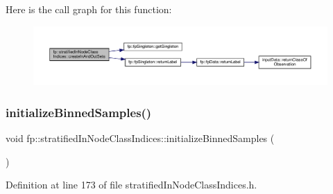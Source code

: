 Here is the call graph for this function\+:\nopagebreak
\begin{figure}[H]
\begin{center}
\leavevmode
\includegraphics[width=350pt]{classfp_1_1stratifiedInNodeClassIndices_a64bc290a78f3800cef41d42ebe64ff1b_cgraph}
\end{center}
\end{figure}
\mbox{\label{classfp_1_1stratifiedInNodeClassIndices_ae9907f8984615f91417fb7961e1b582d}} 
\subsubsection{\texorpdfstring{initialize\+Binned\+Samples()}{initializeBinnedSamples()}}
{\footnotesize\ttfamily void fp\+::stratified\+In\+Node\+Class\+Indices\+::initialize\+Binned\+Samples (\begin{DoxyParamCaption}{ }\end{DoxyParamCaption})\hspace{0.3cm}{\ttfamily [inline]}}



Definition at line 173 of file stratified\+In\+Node\+Class\+Indices.\+h.


